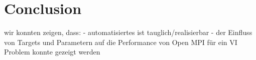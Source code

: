 \section{Conclusion}
wir konnten zeigen, dass:
- automatisiertes ist tauglich/realisierbar
- der Einfluss von Targets und Parametern auf die Performance von Open MPI für ein VI Problem konnte gezeigt werden
